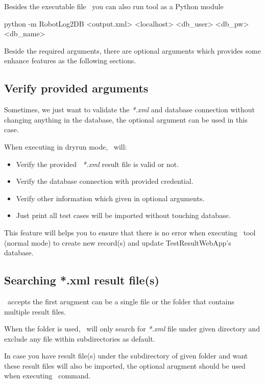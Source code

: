 Besides the executable file \pkg\, you can also run tool as a Python module
\begin{robotlog}
python -m RobotLog2DB <output.xml> <localhost> <db\_user> <db\_pw> <db\_name>
\end{robotlog}

Beside the required arguments, there are optional arguments which provides some enhance
features as the following sections.

\subsection{Verify provided arguments}

Sometimes, we just want to validate the \emph{*.xml} and database
connection without changing anything in the database, the optional
argument  can be used in this case.

When executing in dryrun mode, \pkg\ will:

\begin{itemize}
\tightlist
\item
  Verify the provided \rfwcore\ \emph{*.xml} result file is valid or not.
\item
  Verify the database connection with provided credential.
\item
  Verify other information which given in optional arguments.
\item
  Just print all test cases will be imported without touching database.
\end{itemize}

This feature will helps you to ensure that there is no error when
executing \pkg\ tool (normal mode) to create new record(s) and
update TestResultWebApp's database.

\subsection{Searching *.xml result file(s)}

\pkg\ accepts the first arugment  can be a
single file or the folder that contains multiple result files.

When the folder is used, \pkg\ will only search for
\emph{*.xml} file under given directory and exclude any file within
subdirectories as default.

In case you have result file(s) under the subdirectory of given folder
and want these result files will also be imported, the optional arugment
 should be used when executing \pkg\ command.

